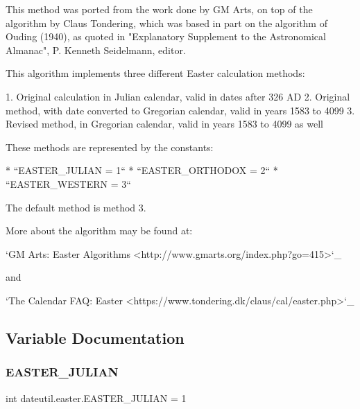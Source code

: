 \begin{DoxyVerb}This method was ported from the work done by GM Arts,
on top of the algorithm by Claus Tondering, which was
based in part on the algorithm of Ouding (1940), as
quoted in "Explanatory Supplement to the Astronomical
Almanac", P.  Kenneth Seidelmann, editor.

This algorithm implements three different Easter
calculation methods:

1. Original calculation in Julian calendar, valid in
   dates after 326 AD
2. Original method, with date converted to Gregorian
   calendar, valid in years 1583 to 4099
3. Revised method, in Gregorian calendar, valid in
   years 1583 to 4099 as well

These methods are represented by the constants:

* ``EASTER_JULIAN   = 1``
* ``EASTER_ORTHODOX = 2``
* ``EASTER_WESTERN  = 3``

The default method is method 3.

More about the algorithm may be found at:

`GM Arts: Easter Algorithms <http://www.gmarts.org/index.php?go=415>`_

and

`The Calendar FAQ: Easter <https://www.tondering.dk/claus/cal/easter.php>`_\end{DoxyVerb}
 

\subsection{Variable Documentation}
\mbox{\label{namespacedateutil_1_1easter_a0f48635544f76e1371844ecbc5761a96}} 
\subsubsection{\texorpdfstring{E\+A\+S\+T\+E\+R\+\_\+\+J\+U\+L\+I\+AN}{EASTER\_JULIAN}}
{\footnotesize\ttfamily int dateutil.\+easter.\+E\+A\+S\+T\+E\+R\+\_\+\+J\+U\+L\+I\+AN = 1}

\mbox{\label{namespacedateutil_1_1easter_af476c86174fc92d91cdbc970e073d5b6}} 
